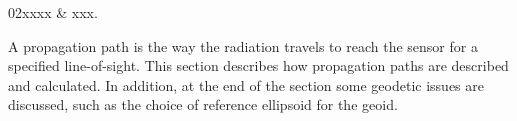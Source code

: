 %
%
 \label{sec:ppath}

%
%
\starthistory
  02xxxx & xxx.\\
\stophistory


%
%
%


A propagation path is the way the radiation travels to reach the
sensor for a specified line-of-sight. This section describes how
propagation paths are described and calculated. In addition, at the
end of the section some geodetic issues are discussed, such as the
choice of reference ellipsoid for the geoid.


